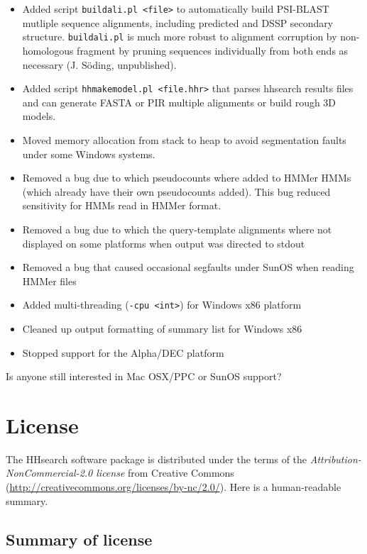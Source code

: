 \documentclass[11pt,a4paper]{article}
\begin{document}
\begin{itemize}
\item{Added script \verb`buildali.pl <file>` to automatically build PSI-BLAST mutliple 
  sequence alignments, including predicted and DSSP secondary structure. 
  \verb`buildali.pl` is much more robust to alignment corruption by non-homologous fragment by
  pruning sequences individually from both ends as necessary (J. S\"oding, unpublished).
}
\item{Added script \verb`hhmakemodel.pl <file.hhr>` that parses hhsearch results files 
  and can generate FASTA or PIR multiple alignments or build rough 3D models.
}
\item{Moved memory allocation from stack to heap to avoid segmentation faults
  under some Windows systems.
}
\item{Removed a bug due to which pseudocounts where added to HMMer HMMs (which 
  already have their own pseudocounts added). This bug reduced sensitivity 
  for HMMs read in HMMer format.
}
\item{Removed a bug due to which the query-template alignments where not displayed
  on some platforms when output was directed to stdout
}
\item{Removed a bug that caused occasional segfaults under SunOS when reading HMMer files
}
\item{Added multi-threading (\verb`-cpu <int>`) for Windows x86 platform
}
\item{Cleaned up output formatting of summary list for Windows x86
}
\item{Stopped support for the Alpha/DEC platform
}
\end{itemize}

Is anyone still interested in Mac OSX/PPC or SunOS support? 


\section{License}

The HHsearch software package is distributed under the terms of the \emph{Attribution-NonCommercial-2.0 license} from Creative Commons (\url{http://creativecommons.org/licenses/by-nc/2.0/}). Here is a human-readable summary.

\subsection*{Summary of license}
\end{document}
